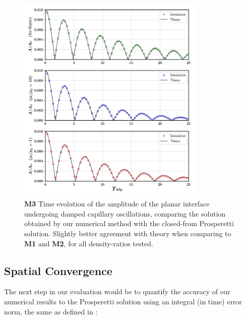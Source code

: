 \begin{figure}[h!]
    \centering
    \includegraphics[width = 0.8\textwidth]{plots/capwave/compare_sagar.png}
	\caption{\textbf{M3} Time evolution of the amplitude of the planar interface undergoing damped capillary oscillations, comparing the solution obtained by our numerical method with the closed-from Prosperetti solution. Slightly better agreement with theory when comparing to \textbf{M1} and \textbf{M2}, for all density-ratios tested. }
    \label{capwave_sagar}
\end{figure}


\subsection*{Spatial Convergence}

The next step in our evaluation would be to quantify the accuracy of our numerical results to the Prosperetti solution using an integral (in time) error norm, the same as defined in \cite{popinet2009accurate} :       


